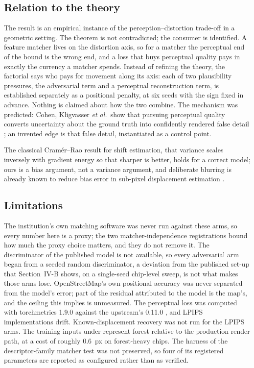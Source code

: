 \subsection{Relation to the theory}

The result is an empirical instance of the perception--distortion trade-off
\cite{blau2018perception} in a geometric setting. The theorem is not contradicted; the
consumer is identified. A feature matcher lives on the distortion axis, so for a matcher
the perceptual end of the bound is the wrong end, and a loss that buys perceptual quality
pays in exactly the currency a matcher spends. Instead of refining the theory, the factorial says who pays for movement along its axis: each
of two plausibility pressures, the adversarial term and a perceptual reconstruction term,
is established separately as a positional penalty, at six seeds with the sign fixed in
advance. Nothing is claimed about how the two combine. The mechanism was predicted: Cohen, Kligvasser \emph{et al.}\ show that pursuing
perceptual quality converts uncertainty about the
ground truth into confidently rendered false detail \cite{cohen2024looks}; an invented edge
is that false detail, instantiated as a control point.

The classical Cram\'er--Rao result for shift estimation, that variance scales inversely
with gradient energy so that sharper is better, holds for a correct model; ours is a bias
argument, not a variance argument, and deliberate blurring is already known to reduce
bias error in sub-pixel displacement estimation \cite{pan2013bias}.

\subsection{Limitations}

The institution's own matching software was never run against these arms, so every
number here is a proxy; the two matcher-independence registrations bound how much the
proxy choice matters, and they do not remove it. The discriminator of the published model
is not available, so every adversarial arm began from a seeded random discriminator, a deviation from the published set-up that Section~IV-B shows, on a single-seed
chip-level sweep, is not what makes those arms lose. OpenStreetMap's own positional accuracy was never separated from the model's error;
part of the residual attributed to the model is the map's, and the ceiling this implies is
unmeasured. The perceptual loss was computed with torchmetrics 1.9.0 against the upstream's 0.11.0
\cite{guasch2026gencp}, and LPIPS implementations drift. Known-displacement recovery was not
run for the LPIPS arms. The training inputs under-represent forest relative to the
production render path, at a cost of roughly 0.6~px on forest-heavy chips. The harness of
the descriptor-family matcher test was not preserved, so four of its registered parameters
are reported as configured rather than as verified.

